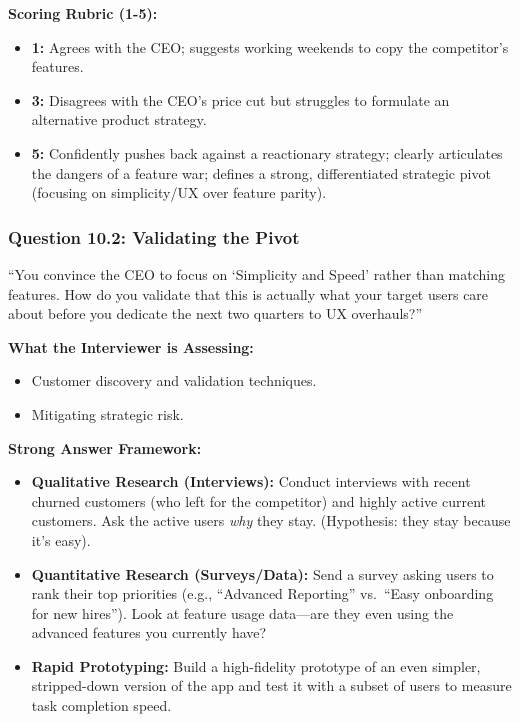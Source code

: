 \documentclass[
  11pt,
  openany,
  oneside]{book}
\providecommand{\tightlist}{%
  \setlength{\itemsep}{0pt}\setlength{\parskip}{0pt}}
\begin{document}
\textbf{Scoring Rubric (1-5):}

\begin{itemize}
\tightlist
\item
  \textbf{1:} Agrees with the CEO; suggests working weekends to copy the
  competitor's features.
\item
  \textbf{3:} Disagrees with the CEO's price cut but struggles to
  formulate an alternative product strategy.
\item
  \textbf{5:} Confidently pushes back against a reactionary strategy;
  clearly articulates the dangers of a feature war; defines a strong,
  differentiated strategic pivot (focusing on simplicity/UX over feature
  parity).
\end{itemize}

\subsubsection{Question 10.2: Validating the
Pivot}\label{question-10.2-validating-the-pivot}

``You convince the CEO to focus on `Simplicity and Speed' rather than
matching features. How do you validate that this is actually what your
target users care about before you dedicate the next two quarters to UX
overhauls?''

\textbf{What the Interviewer is Assessing:}

\begin{itemize}
\tightlist
\item
  Customer discovery and validation techniques.
\item
  Mitigating strategic risk.
\end{itemize}

\textbf{Strong Answer Framework:}

\begin{itemize}
\tightlist
\item
  \textbf{Qualitative Research (Interviews):} Conduct interviews with
  recent churned customers (who left for the competitor) and highly
  active current customers. Ask the active users \emph{why} they stay.
  (Hypothesis: they stay because it's easy).
\item
  \textbf{Quantitative Research (Surveys/Data):} Send a survey asking
  users to rank their top priorities (e.g., ``Advanced Reporting''
  vs.~``Easy onboarding for new hires''). Look at feature usage
  data---are they even using the advanced features you currently have?
\item
  \textbf{Rapid Prototyping:} Build a high-fidelity prototype of an even
  simpler, stripped-down version of the app and test it with a subset of
  users to measure task completion speed.
\end{itemize}
\end{document}
